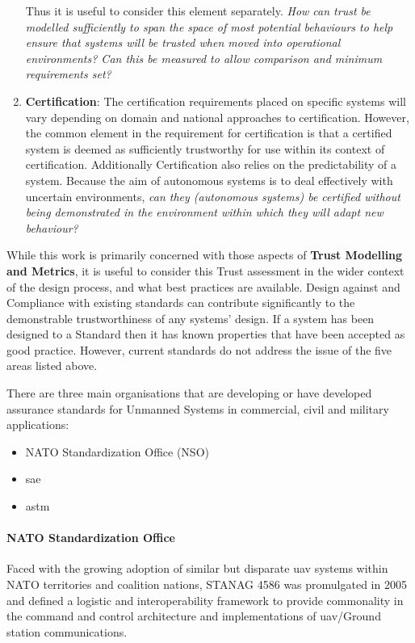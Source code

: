 \begin{enumerate}
    Thus it is useful to consider this element separately.
    \textit{How can trust be modelled sufficiently to span the space of most potential behaviours to help ensure that systems will be trusted when moved into operational environments?
    Can this be measured to allow comparison and minimum requirements set?}
  \item \textbf{Certification}: The certification requirements placed on specific systems will vary depending on domain and national approaches to certification.
    However, the common element in the requirement for certification is that a certified system is deemed as sufficiently trustworthy for use within its context of certification.
    Additionally Certification also relies on the predictability of a system.
    Because the aim of autonomous systems is to deal effectively with uncertain environments, \textit{can they (autonomous systems) be certified without being demonstrated in the environment within which they will adapt new behaviour?}
\end{enumerate}

While this work is primarily concerned with those aspects of \textbf{Trust Modelling and Metrics}, it is useful to consider this Trust assessment in the wider context of the design process, and what best practices are available.
Design against and Compliance with existing standards can contribute significantly to the demonstrable trustworthiness of any systems’ design.
If a system has been designed to a Standard then it has known properties that have been accepted as good practice.
However, current standards do not address the issue of the five areas listed above.

There are three main organisations that are developing or have developed assurance standards for Unmanned Systems in commercial, civil and military applications:

\begin{itemize}
  \item NATO Standardization Office (NSO)
  \item \acrfull{sae}
  \item \acrfull{astm}
\end{itemize}

\paragraph{NATO Standardization Office}
Faced with the growing adoption of similar but disparate \gls{uav} systems within NATO territories and coalition nations, STANAG 4586\cite{STANAG4586} was promulgated in 2005 and defined a logistic and interoperability framework to provide commonality in the command and control architecture and implementations of \gls{uav}/Ground station communications.

